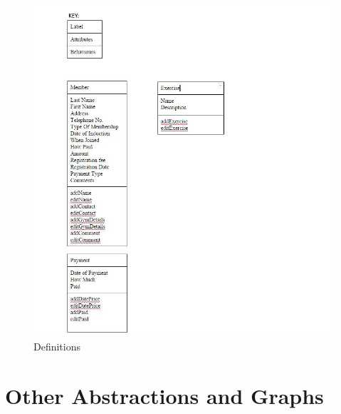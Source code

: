 \begin{figure}[H]
    \includegraphics[width=\textwidth]{ClassDefinitions.JPG}
    \caption{Definitions} \label{fig: Definitions}
\end{figure}

\section{Other Abstractions and Graphs}

